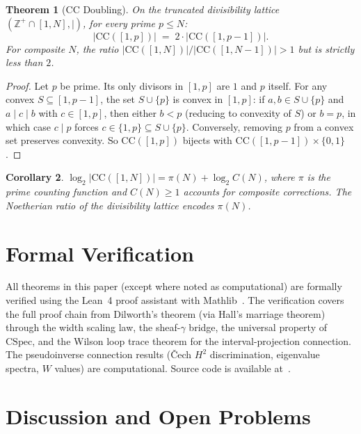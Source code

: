 \documentclass[11pt,a4paper]{article}
\theoremstyle{plain}
\newtheorem{theorem}{Theorem}[section]
\newtheorem{corollary}[theorem]{Corollary}
\theoremstyle{definition}
\theoremstyle{remark}
\newcommand{\CSpec}{\mathrm{CSpec}}
\newcommand{\CC}{\mathrm{CC}}
\newcommand{\Z}{\mathbb{Z}}
\begin{document}
\begin{theorem}[CC Doubling]\label{thm:doubling}
On the truncated divisibility lattice $(\Z^+ \cap [1,N], \mid)$, for every prime $p \leq N$:
\[
|\CC([1,p])| \;=\; 2 \cdot |\CC([1, p-1])|.
\]
For composite $N$, the ratio $|\CC([1,N])| / |\CC([1, N-1])| > 1$ but is strictly less than $2$.
\end{theorem}

\begin{proof}
Let $p$ be prime. Its only divisors in $[1,p]$ are $1$ and $p$ itself.
For any convex $S \subseteq [1, p-1]$, the set $S \cup \{p\}$ is convex in $[1,p]$: if $a, b \in S \cup \{p\}$ and $a \mid c \mid b$ with $c \in [1,p]$, then either $b < p$ (reducing to convexity of $S$) or $b = p$, in which case $c \mid p$ forces $c \in \{1, p\} \subseteq S \cup \{p\}$.
Conversely, removing $p$ from a convex set preserves convexity.
So $\CC([1,p])$ bijects with $\CC([1, p-1]) \times \{0, 1\}$.
\end{proof}

\begin{corollary}\label{cor:primes}
$\log_2 |\CC([1,N])| = \pi(N) + \log_2 C(N)$, where $\pi$ is the prime counting function and $C(N) \geq 1$ accounts for composite corrections.
The Noetherian ratio of the divisibility lattice encodes $\pi(N)$.
\end{corollary}



\section{Formal Verification}\label{sec:verification}

All theorems in this paper (except where noted as computational) are formally verified using the Lean~4 proof assistant with Mathlib~\cite{mathlib}.
The verification covers the full proof chain from Dilworth's theorem (via Hall's marriage theorem) through the width scaling law, the sheaf-$\gamma$ bridge, the universal property of $\CSpec$, and the Wilson loop trace theorem for the interval-projection connection.
The pseudoinverse connection results (\v{C}ech $H^2$ discrimination, eigenvalue spectra, $W$ values) are computational.
Source code is available at~\cite{leanrepo}.

\section{Discussion and Open Problems}\label{sec:discussion}
\end{document}
